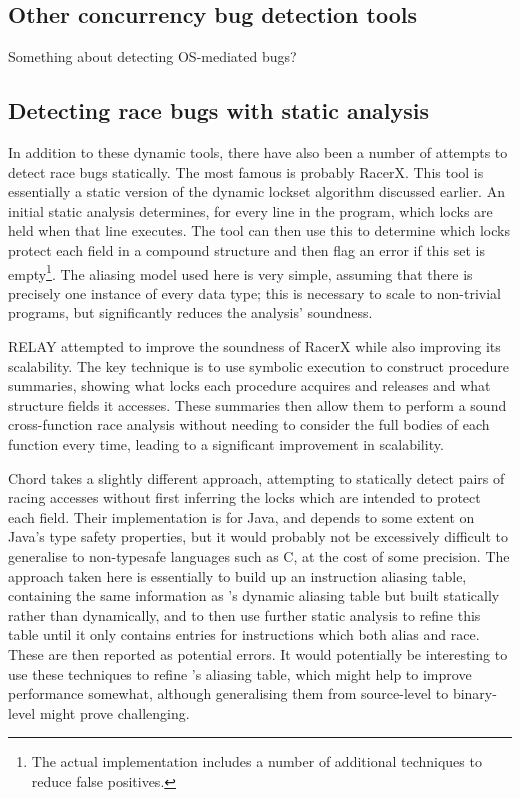 \subsection{Other concurrency bug detection tools}

Something about detecting OS-mediated bugs?

\cite{Uppuluri2005} \cite{Pu2006}

\subsection{Detecting race bugs with static analysis}

In addition to these dynamic tools, there have also been a number of
attempts to detect race bugs statically.  The most famous is probably
RacerX\cite{Engler2003}.  This tool is essentially a static version of
the dynamic lockset algorithm discussed earlier.  An initial static
analysis determines, for every line in the program, which locks are
held when that line executes.  The tool can then use this to determine
which locks protect each field in a compound structure and then flag
an error if this set is empty\footnote{The actual implementation
  includes a number of additional techniques to reduce false
  positives.}.  The aliasing model used here is very simple, assuming
that there is precisely one instance of every data type; this is
necessary to scale to non-trivial programs, but significantly reduces
the analysis' soundness.

RELAY attempted to
improve the soundness of RacerX while also improving its scalability.
The key technique is to use symbolic execution to construct procedure
summaries, showing
what locks each procedure acquires and releases and what structure
fields it accesses.  These summaries then allow them to perform a
sound cross-function race analysis without needing to consider the
full bodies of each function every time, leading to a significant
improvement in scalability.  

Chord takes a slightly
different approach, attempting to statically detect pairs of racing
accesses without first inferring the locks which are intended to
protect each field.  Their implementation is for Java, and depends to
some extent on Java's type safety properties, but it would probably
not be excessively difficult to generalise to non-typesafe languages
such as C, at the cost of some precision.  The approach taken here is
essentially to build up an instruction aliasing table, containing the
same information as {\technique}'s dynamic aliasing table but built
statically rather than dynamically, and to then use further static
analysis to refine this table until it only contains entries for
instructions which both alias and race.  These are then reported as
potential errors.  It would potentially be interesting to use these
techniques to refine {\technique}'s aliasing table, which might help
to improve performance somewhat, although generalising them from
source-level to binary-level might prove challenging.

